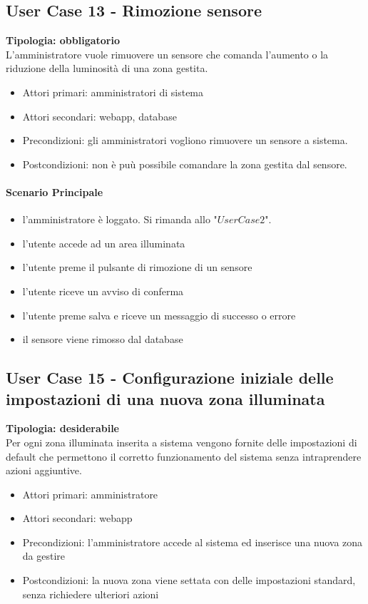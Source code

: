\documentclass[12pt]{article}
\begin{document}
\subsection{User Case 13 - Rimozione sensore}
\textbf{Tipologia: obbligatorio}\\
L'amministratore vuole rimuovere un sensore che comanda l'aumento o la riduzione della luminosità di una zona gestita.
\begin{itemize}
	\item Attori primari: amministratori di sistema
	\item Attori secondari: webapp, database
	\item Precondizioni: gli amministratori vogliono rimuovere un sensore a sistema.\\
	\item Postcondizioni: non è puù possibile comandare la zona gestita dal sensore.
\end{itemize}
\paragraph{Scenario Principale}
\begin{itemize}
	\item l'amministratore è loggato. Si rimanda allo "$User Case 2$".
	\item l'utente accede ad un area illuminata
	\item l'utente preme il pulsante di rimozione di un sensore
	\item l'utente riceve un avviso di conferma
	\item l'utente preme salva e riceve un messaggio di successo o errore
	\item il sensore viene rimosso dal database
\end{itemize}

\subsection{User Case 15 - Configurazione iniziale delle impostazioni di una nuova zona illuminata}
\textbf{Tipologia: desiderabile} \\
Per ogni zona illuminata inserita a sistema vengono fornite delle impostazioni di default che permettono il corretto funzionamento del sistema senza intraprendere azioni aggiuntive.
\begin{itemize}
	\item Attori primari: amministratore
	\item Attori secondari: webapp
	\item Precondizioni: l'amministratore accede al sistema ed inserisce una nuova zona da gestire
	\item Postcondizioni: la nuova zona viene settata con delle impostazioni standard, senza richiedere ulteriori azioni
\end{itemize}
\end{document}
